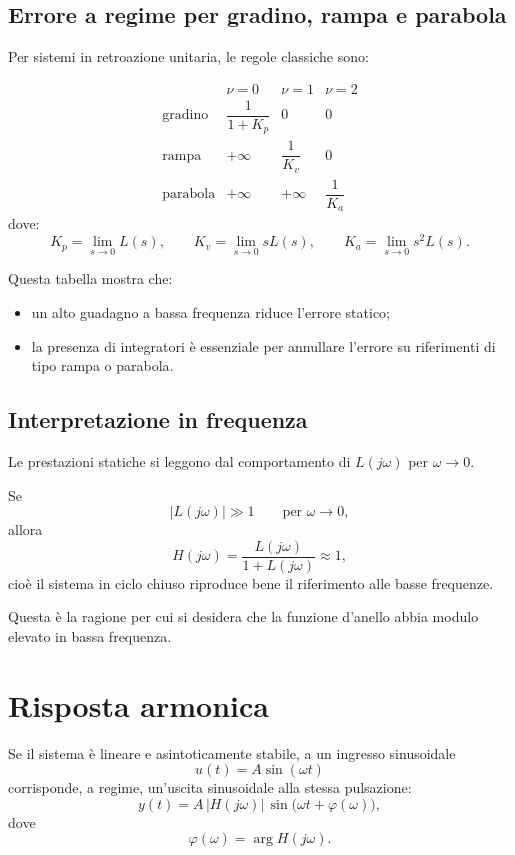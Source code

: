 \subsection{Errore a regime per gradino, rampa e parabola}

Per sistemi in retroazione unitaria, le regole classiche sono:

\[
\begin{array}{c|ccc}
 & \nu=0 & \nu=1 & \nu=2 \\ \hline
\text{gradino} & \dfrac{1}{1+K_p} & 0 & 0 \\[1.2ex]
\text{rampa} & +\infty & \dfrac{1}{K_v} & 0 \\[1.2ex]
\text{parabola} & +\infty & +\infty & \dfrac{1}{K_a}
\end{array}
\]
dove:
\[
K_p=\lim_{s\to 0}L(s),\qquad
K_v=\lim_{s\to 0}sL(s),\qquad
K_a=\lim_{s\to 0}s^2L(s).
\]

Questa tabella mostra che:
\begin{itemize}
    \item un alto guadagno a bassa frequenza riduce l'errore statico;
    \item la presenza di integratori è essenziale per annullare l'errore
    su riferimenti di tipo rampa o parabola.
\end{itemize}

\subsection{Interpretazione in frequenza}

Le prestazioni statiche si leggono dal comportamento di \(L(j\omega)\) per \(\omega\to 0\).

Se
\[
|L(j\omega)|\gg 1 \qquad \text{per } \omega\to 0,
\]
allora
\[
H(j\omega)=\frac{L(j\omega)}{1+L(j\omega)}\approx 1,
\]
cioè il sistema in ciclo chiuso riproduce bene il riferimento alle basse frequenze.

Questa è la ragione per cui si desidera che la funzione d'anello abbia
modulo elevato in bassa frequenza.

\section{Risposta armonica}

Se il sistema è lineare e asintoticamente stabile, a un ingresso sinusoidale
\[
u(t)=A\sin(\omega t)
\]
corrisponde, a regime, un'uscita sinusoidale alla stessa pulsazione:
\[
y(t)=A\,|H(j\omega)|\,\sin\bigl(\omega t+\varphi(\omega)\bigr),
\]
dove
\[
\varphi(\omega)=\arg H(j\omega).
\]

